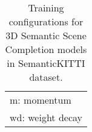 \documentclass{article}
\begin{document}
\begin{table}[tbh]
\begin{adjustbox}{max width=\textwidth}
\begin{tabular}{cccccl}
\multicolumn{6}{l}{m: momentum}                                                                                                                                                                                                                                            \\
\multicolumn{6}{l}{wd: weight decay}                                                                                                                                                                                                                                      
\end{tabular}
\end{adjustbox}
\caption{Training configurations for 3D Semantic Scene Completion models in SemanticKITTI dataset.}
\label{table: 3d_training_configs}
\end{table}
\end{document}
